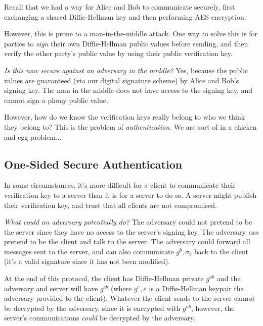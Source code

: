Recall that we had a way for Alice and Bob to communicate securely, first exchanging a shared Diffie-Hellman key and then performing AES encryption.


However, this is prone to a man-in-the-middle attack. One way to solve this is for parties to \emph{sign} their own Diffie-Hellman public values before sending, and then verify the other party's public value by using their public verification key.


\emph{Is this now secure against an adversary in the middle?} Yes, because the public values are guaranteed (via our digital signature scheme) by Alice and Bob's signing key. The man in the middle does not have access to the signing key, and cannot sign a phony public value.

However, how do we know the verification keys really belong to who we think they belong to? This is the problem of \emph{authentication}. We are sort of in a chicken and egg problem...

\subsection{One-Sided Secure Authentication}
In some circumstances, it's more difficult for a client to communicate their verification key to a server than it is for a server to do so. A server might publish their verification key, and trust that all clients are not compromised.


\emph{What could an adversary potentially do?} The adversary could not pretend to be the server since they have no access to the server's signing key. The adversary \emph{can} pretend to be the client and talk to the server. The adversary could forward all messages sent to the server, and can also communicate $g^b, \sigma_b$ back to the client (it's a valid signature since it has not been modified).

At the end of this protocol, the client has Diffie-Hellman private $g^{ab}$ and the adversary and server will have $g^{eb}$ (where $g^e, e$ is a Diffie-Hellman keypair the adversary provided to the client). Whatever the client sends to the server cannot be decrypted by the adversary, since it is encrypted with $g^{ab}$, however, the server's communications \emph{could} be decrypted by the adversary.

